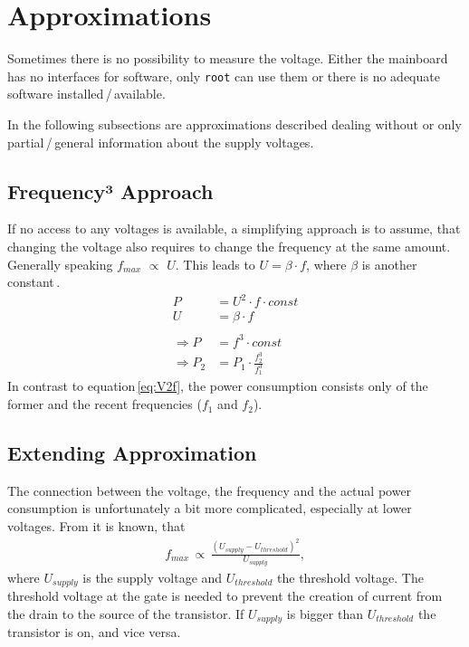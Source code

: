 \section{Approximations}
\label{sec:approximations}
Sometimes there is no possibility to measure the voltage. Either the mainboard has no interfaces for software, only \lstinline!root! can use them or there is no adequate software installed\,/\,available.

In the following subsections are approximations described dealing without or only partial\,/\,general information about the supply voltages.

\subsection{Frequency³ Approach}
\label{sec:freq3}
If no access to any voltages is available, a simplifying approach is to assume, that changing the voltage also requires to change the frequency at the same amount. Generally speaking $f_{max}$ $\propto$ $U$. This leads to $U = \beta \cdot f$, where $\beta$ is another constant\,\cite{efficientserverclusters}.
%
\begin{align}
	P &= U^2 \cdot f \cdot const \nonumber \\
	U &= \beta \cdot f \label{eq:ubetaf} \\
	\nonumber \\
	\Rightarrow P &= f^3 \cdot const \nonumber \\
	\Rightarrow P_{2} &= P_{1} \cdot \frac{f^3_2}{f^3_1}\label{eq:f3}
\end{align}
%
In contrast to equation\,\eqref{eq:V2f}, the power consumption consists only of the former and the recent frequencies ($f_1$ and $f_2$).

\subsection{Extending Approximation}
\label{sec:approx}
The connection between the voltage, the frequency and the actual power consumption is unfortunately a bit more complicated, especially at lower voltages. From \cite{power} it is known, that 
\begin{align*}
f_{max} \, \propto \, \frac{(U_{supply} - U_{threshold})^2}{U_{supply}},
\end{align*}
where $U_{supply}$ is the supply voltage and $U_{threshold}$ the threshold voltage.
The threshold voltage at the gate is needed to prevent the creation of current from the drain to the source of the transistor. If $U_{supply}$ is bigger than $U_{threshold}$ the transistor is on, and vice versa. 

